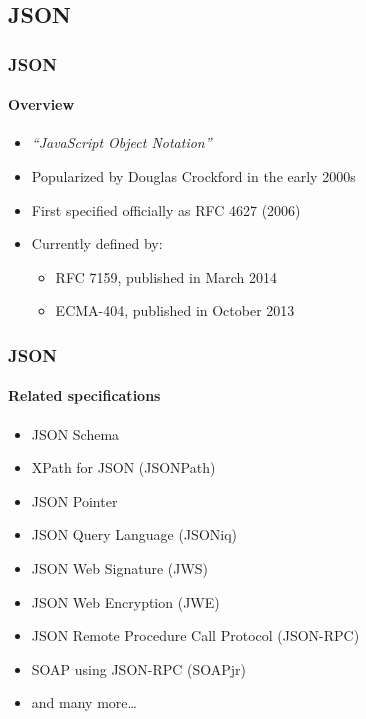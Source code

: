 \documentclass[
    alternativetitlepage=alternativ,
    cornerlogo=hgi_nds_logo2,
    sectionoverview,
]{rubpresentation}
\begin{document}
\subsection{JSON}

\begin{frame}
    \frametitle{JSON}
    \framesubtitle{Overview}
    \begin{itemize}
        \item{} \emph{\enquote{JavaScript Object Notation}}\\
        \item{} Popularized by Douglas Crockford in the early 2000s\\
        \item{} First specified officially as RFC 4627 (2006)\\
        \item{} Currently defined by:
            \begin{itemize}
                \item{} RFC 7159, published in March 2014\\
                \item{} ECMA-404, published in October 2013\\
            \end{itemize}
    \end{itemize}
\end{frame}

\begin{frame}
    \frametitle{JSON}
    \framesubtitle{Related specifications}
    \begin{itemize}
        \item{} JSON Schema\\
        \item{} XPath for JSON (JSONPath)\\
        \item{} JSON Pointer\\
        \item{} JSON Query Language (JSONiq)\\
        \item{} JSON Web Signature (JWS)
        \item{} JSON Web Encryption (JWE)
        \item{} JSON Remote Procedure Call Protocol (JSON-RPC)\\
        \item{} SOAP using JSON-RPC (SOAPjr)\\
        \item{} and many more\ldots{}\\
    \end{itemize}
\end{frame}
\end{document}
